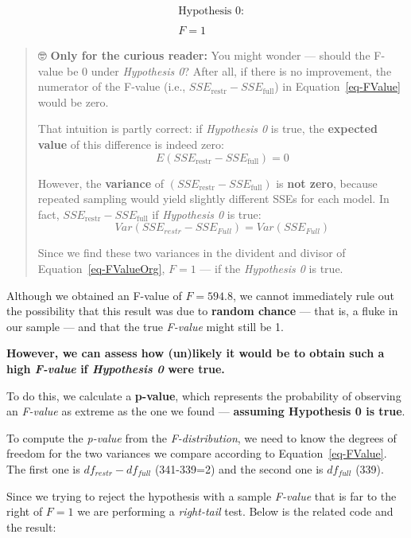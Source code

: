 \documentclass[
  letterpaper,
  DIV=11,
  numbers=noendperiod]{scrartcl}
\begin{document}
\[
\begin{align}
&\text{Hypothesis 0:}\\
\\
&F=1
\end{align}
\]

\begin{quote}
🤓 \textbf{Only for the curious reader:} You might wonder --- should the
F-value be 0 under \emph{Hypothesis 0}? After all, if there is no
improvement, the numerator of the F-value (i.e.,
\(SSE_{\text{restr}} - SSE_{\text{full}}\)) in Equation~\ref{eq-FValue}
would be zero.

That intuition is partly correct: if \emph{Hypothesis 0} is true, the
\textbf{expected value} of this difference is indeed zero: \[
E(SSE_{\text{restr}} - SSE_{\text{full}}) = 0
\]

However, the \textbf{variance} of
\((SSE_{\text{restr}} - SSE_{\text{full}})\) is \textbf{not zero},
because repeated sampling would yield slightly different SSEs for each
model. In fact, \(SSE_{\text{restr}} - SSE_{\text{full}}\) if
\emph{Hypothesis 0} is true:
\[Var(SSE_{restr}-SSE_{Full})=Var(SSE_{Full})\]

Since we find these two variances in the divident and divisor of
Equation~\ref{eq-FValueOrg}, \(F=1\) --- if the \emph{Hypothesis 0} is
true.
\end{quote}

Although we obtained an F-value of \(F = 594.8\), we cannot immediately
rule out the possibility that this result was due to \textbf{random
chance} --- that is, a fluke in our sample --- and that the true
\emph{F-value} might still be 1.

\textbf{However, we can assess how (un)likely it would be to obtain such
a high \emph{F-value} if \emph{Hypothesis 0} were true.}

To do this, we calculate a \textbf{p-value}, which represents the
probability of observing an \emph{F-value} as extreme as the one we
found --- \textbf{assuming Hypothesis 0 is true}.

To compute the \emph{p-value} from the \emph{F-distribution}, we need to
know the degrees of freedom for the two variances we compare according
to Equation~\ref{eq-FValue}. The first one is \(df_{restr}-df_{full}\)
(341-339=2) and the second one is \(df_{full}\) (339).

Since we trying to reject the hypothesis with a sample \emph{F-value}
that is far to the right of \(F=1\) we are performing a
\emph{right-tail} test. Below is the related code and the result:
\end{document}
